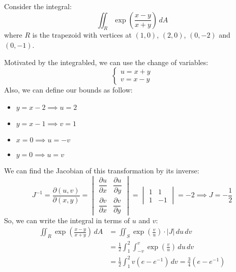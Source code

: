\documentclass[11pt]{report}
\begin{document}
\begin{example}
    Consider the integral:  
    $$
        \iint_R \exp{\left(\frac{x - y}{x + y}\right)} \, dA
    $$
    where $R$ is the trapezoid with vertices at $(1,0)$, $(2,0)$, $(0,-2)$ and $(0,-1)$.

    Motivated by the integrabled, we can use the change of variables:
    $$
    \begin{cases}
        u = x + y \\
        v = x - y
    \end{cases} 
    $$
    Also, we can define our bounds as follow:
    \begin{itemize}
        \item $y = x - 2 \implies u = 2$
        \item $y = x - 1 \implies v = 1$
        \item $x = 0 \implies u = -v$
        \item $y = 0 \implies u = v$
    \end{itemize}
    We can find the Jacobian of this transformation by its inverse:
    $$
    J^{-1} = \frac{\partial(u,v)}{\partial(x,y)} = \begin{vmatrix}
        \dfrac{\partial u}{\partial x} & \dfrac{\partial u}{\partial y} \\
        \dfrac{\partial v}{\partial x} & \dfrac{\partial v}{\partial y}
    \end{vmatrix} = \begin{vmatrix}
        1 & 1 \\
        1 & -1
    \end{vmatrix} = -2 \implies J = -\frac{1}{2}
    $$
    So, we can write the integral in terms of $u$ and $v$:
    \begin{align*}
        \iint_R \exp{\left(\frac{x - y}{x + y}\right)} \, dA &= \iint_S \exp{\left(\frac{v}{u}\right)} \cdot |J| \, du \, dv \\
        &= \frac{1}{2} \int_1^2 \int_{-v}^{v} \exp{\left(\frac{v}{u}\right)} \, du \, dv \\
        &= \frac{1}{2} \int_1^2 v(e - e^{-1}) \, dv = \frac{3}{4} (e - e^{-1})
    \end{align*}
\end{example}
\end{document}
